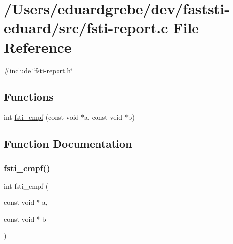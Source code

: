 \hypertarget{fsti-report_8c}{}\section{/\+Users/eduardgrebe/dev/faststi-\/eduard/src/fsti-\/report.c File Reference}
\label{fsti-report_8c}
{\ttfamily \#include \char`\"{}fsti-\/report.\+h\char`\"{}}\newline
\subsection*{Functions}
\begin{DoxyCompactItemize}
\item 
int \mbox{\hyperlink{fsti-report_8c_a01f88429a83ea714459262c661ba9859}{fsti\+\_\+cmpf}} (const void $\ast$a, const void $\ast$b)
\end{DoxyCompactItemize}


\subsection{Function Documentation}
\mbox{\label{fsti-report_8c_a01f88429a83ea714459262c661ba9859}} 
\subsubsection{\texorpdfstring{fsti\+\_\+cmpf()}{fsti\_cmpf()}}
{\footnotesize\ttfamily int fsti\+\_\+cmpf (\begin{DoxyParamCaption}\item[{const void $\ast$}]{a,  }\item[{const void $\ast$}]{b }\end{DoxyParamCaption})}

